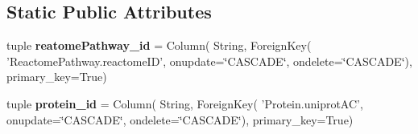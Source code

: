 \subsection*{Static Public Attributes}
\begin{DoxyCompactItemize}
\item 
\hypertarget{classsrc_1_1fr_1_1tagc_1_1rainet_1_1core_1_1data_1_1ProteinReactomeAnnotation_1_1ProteinReactomeAnnotation_adf61fb3dd30fc5839bde907a0a2345d9}{tuple {\bfseries reatome\-Pathway\-\_\-id} = Column( String, Foreign\-Key( 'Reactome\-Pathway.\-reactome\-I\-D', onupdate=\char`\"{}C\-A\-S\-C\-A\-D\-E\char`\"{}, ondelete=\char`\"{}C\-A\-S\-C\-A\-D\-E\char`\"{}), primary\-\_\-key=True)}\label{classsrc_1_1fr_1_1tagc_1_1rainet_1_1core_1_1data_1_1ProteinReactomeAnnotation_1_1ProteinReactomeAnnotation_adf61fb3dd30fc5839bde907a0a2345d9}

\item 
\hypertarget{classsrc_1_1fr_1_1tagc_1_1rainet_1_1core_1_1data_1_1ProteinReactomeAnnotation_1_1ProteinReactomeAnnotation_a6e9b4ec5163b74c0507eed31d28fa2a7}{tuple {\bfseries protein\-\_\-id} = Column( String, Foreign\-Key( 'Protein.\-uniprot\-A\-C', onupdate=\char`\"{}C\-A\-S\-C\-A\-D\-E\char`\"{}, ondelete=\char`\"{}C\-A\-S\-C\-A\-D\-E\char`\"{}), primary\-\_\-key=True)}\label{classsrc_1_1fr_1_1tagc_1_1rainet_1_1core_1_1data_1_1ProteinReactomeAnnotation_1_1ProteinReactomeAnnotation_a6e9b4ec5163b74c0507eed31d28fa2a7}

\end{DoxyCompactItemize}


